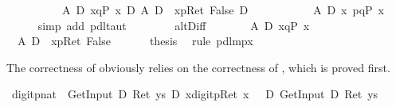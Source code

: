 \begin{isabellebody}
\ \ \ \ \ \ \ \ \ \ {\isacharparenleft}A\ {\isasymlongrightarrow}\isactrlsub D\ {\isasymlangle}x{\isasymleftarrow}q{\isasymrangle}{\isacharparenleft}P\ x{\isacharparenright}{\isacharparenright}\ {\isasymlongrightarrow}\isactrlsub D\ {\isacharparenleft}A\ {\isasymlongrightarrow}\isactrlsub D\ {\isacharbrackleft}{\isacharhash}\ x{\isasymleftarrow}p{\isacharbrackright}{\isacharparenleft}Ret\ False{\isacharparenright}{\isacharparenright}\ {\isasymlongrightarrow}\isactrlsub D\isanewline
\ \ \ \ \ \ \ \ \ \ \ A\ {\isasymlongrightarrow}\isactrlsub D\ {\isasymlangle}x{\isasymleftarrow}\ p{\isasymparallel}q{\isasymrangle}{\isacharparenleft}P\ x{\isacharparenright}{\isachardoublequote}\isanewline
\ \ \ \ \isamarkupfalse%
\ {\isacharparenleft}simp\ add{\isacharcolon}\ pdl{\isacharunderscore}taut{\isacharparenright}\isanewline
\ \ \isamarkupfalse%
\ \isanewline
\ \ \isamarkupfalse%
\ altD{\isacharunderscore}iff\isanewline
\ \ \isamarkupfalse%
\isanewline
\ \ \isamarkupfalse%
\ {\isachardoublequote}{\isasymturnstile}\ A\ {\isasymlongrightarrow}\isactrlsub D\ {\isasymlangle}x{\isasymleftarrow}q{\isasymrangle}{\isacharparenleft}P\ x{\isacharparenright}{\isachardoublequote}\isanewline
\ \ \isamarkupfalse%
\isanewline
\ \ \isamarkupfalse%
\ {\isachardoublequote}{\isasymturnstile}\ A\ {\isasymlongrightarrow}\isactrlsub D\ {\isacharbrackleft}{\isacharhash}\ x{\isasymleftarrow}p{\isacharbrackright}{\isacharparenleft}Ret\ False{\isacharparenright}{\isachardoublequote}\isanewline
\ \ \isamarkupfalse%
\isanewline
\ \ \isamarkupfalse%
\ {\isacharquery}thesis\ \isamarkupfalse%
\ {\isacharparenleft}rule\ pdl{\isacharunderscore}mp{\isacharunderscore}{}x{\isacharparenright}\isanewline
\isamarkupfalse%
\isamarkupfalse%
%
\begin{isamarkuptext}%
The correctness of  obviously relies on the correctness of , 
  which is proved first.%
\end{isamarkuptext}%
\isamarkuptrue%
\ digitp{\isacharunderscore}nat{\isacharcolon}\ {\isachardoublequote}{\isasymturnstile}\ GetInput\ {\isacharequal}\isactrlsub D\ Ret\ {\isacharparenleft}{}{\isacharhash}ys{\isacharparenright}\ {\isasymlongrightarrow}\isactrlsub D\ {\isasymlangle}x{\isasymleftarrow}digitp{\isasymrangle}{\isacharparenleft}Ret\ {\isacharparenleft}x\ {\isacharequal}\ {}{\isacharparenright}\ {\isasymand}\isactrlsub D\ GetInput\ {\isacharequal}\isactrlsub D\ Ret\ ys{\isacharparenright}{\isachardoublequote}\isanewline

\end{isabellebody}

